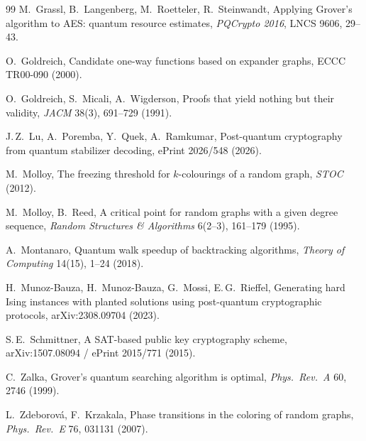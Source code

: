 \documentclass[11pt]{article}
\begin{document}
\begin{thebibliography}{99}
M.~Grassl, B.~Langenberg, M.~Roetteler, R.~Steinwandt, Applying Grover's algorithm to AES: quantum resource estimates, \emph{PQCrypto 2016}, LNCS 9606, 29--43.

O.~Goldreich, Candidate one-way functions based on expander graphs, ECCC TR00-090 (2000).

O.~Goldreich, S.~Micali, A.~Wigderson, Proofs that yield nothing but their validity, \emph{JACM} 38(3), 691--729 (1991).

J.\,Z.~Lu, A.~Poremba, Y.~Quek, A.~Ramkumar, Post-quantum cryptography from quantum stabilizer decoding, ePrint 2026/548 (2026).

M.~Molloy, The freezing threshold for $k$-colourings of a random graph, \emph{STOC} (2012).

M.~Molloy, B.~Reed, A critical point for random graphs with a given degree sequence, \emph{Random Structures \& Algorithms} 6(2--3), 161--179 (1995).

A.~Montanaro, Quantum walk speedup of backtracking algorithms, \emph{Theory of Computing} 14(15), 1--24 (2018).

H.~Munoz-Bauza, H.~Munoz-Bauza, G.~Mossi, E.\,G.~Rieffel, Generating hard Ising instances with planted solutions using post-quantum cryptographic protocols, arXiv:2308.09704 (2023).

S.\,E.~Schmittner, A SAT-based public key cryptography scheme, arXiv:1507.08094 / ePrint 2015/771 (2015).

C.~Zalka, Grover's quantum searching algorithm is optimal, \emph{Phys.\ Rev.\ A} 60, 2746 (1999).

L.~Zdeborov\'{a}, F.~Krzakala, Phase transitions in the coloring of random graphs, \emph{Phys.\ Rev.\ E} 76, 031131 (2007).

\end{thebibliography}
\end{document}
